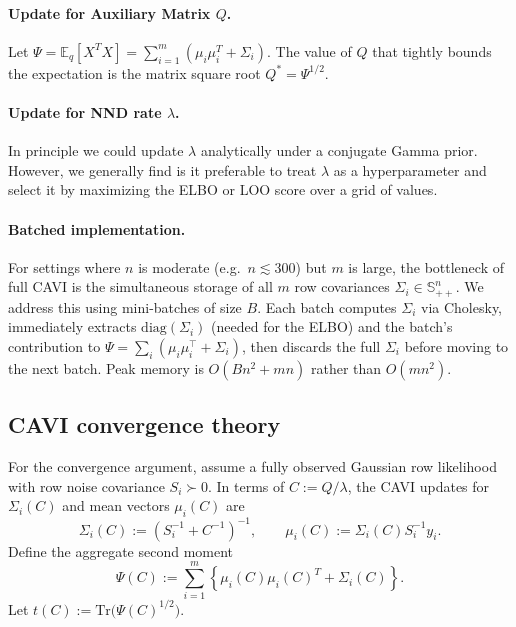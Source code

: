 \documentclass[11pt]{article}
\begin{document}
\paragraph{Update for Auxiliary Matrix $Q$.} Let $\Psi = \mathbb{E}_{q}[X^T X] = \sum_{i=1}^m (\mu_i \mu_i^T + \Sigma_i)$. The value of $Q$ that tightly bounds the expectation is the matrix square root $Q^* = \Psi^{1/2}$. 

\paragraph{Update for NND rate $\lambda$.} In principle we could update $\lambda$ analytically under a conjugate Gamma prior. However, we generally find is it preferable to treat $\lambda$ as a hyperparameter and select it by maximizing the ELBO or LOO score over a grid of values.

\paragraph{Batched implementation.} For settings where $n$ is moderate (e.g.\ $n \lesssim 300$) but $m$ is large, the bottleneck of full CAVI is the simultaneous storage of all $m$ row covariances $\Sigma_i \in \mathbb{S}_{++}^n$. We address this using mini-batches of size $B$. Each batch computes $\Sigma_i$ via Cholesky, immediately extracts $\mathrm{diag}(\Sigma_i)$ (needed for the ELBO) and the batch's contribution to $\Psi = \sum_i (\mu_i\mu_i^\top + \Sigma_i)$, then discards the full $\Sigma_i$ before moving to the next batch. Peak memory is $O(Bn^2 + mn)$ rather than $O(mn^2)$. 

\subsection{CAVI convergence theory} \label{app:contraction}

For the convergence argument, assume a fully observed Gaussian row likelihood with row noise covariance $S_i \succ 0$.  In terms of $C:=Q/\lambda$, the CAVI updates for $\Sigma_i(C)$ and mean vectors $\mu_i(C)$ are
\begin{equation}
\Sigma_i(C) := \left(S_i^{-1} + C^{-1}\right)^{-1}, \qquad
\mu_i(C) := \Sigma_i(C) S_i^{-1} y_i.
\end{equation}
Define the aggregate second moment
\begin{equation}
\Psi(C) := \sum_{i=1}^m \left\{\mu_i(C)\mu_i(C)^T + \Sigma_i(C)\right\}.
\end{equation}
Let $t(C) := \text{Tr}\big(\Psi(C)^{1/2}\big)$.
\end{document}
